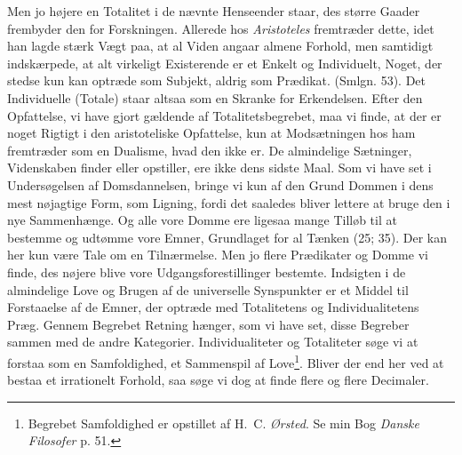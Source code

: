 \documentclass[12pt,a4paper]{book}
\newcommand{\apage}[1]{\marginnote{\footnotesize\textit{[#1]}}}
\begin{document}
Men jo højere en Totalitet i de nævnte Henseender staar, des større Gaader frembyder
den for Forskningen. Allerede hos \emph{Aristoteles} fremtræder dette, idet han
lagde stærk Vægt paa, at al Viden angaar almene Forhold, men samtidigt indskærpede,
at alt virkeligt Existerende er et Enkelt og Individuelt, Noget, der stedse kun kan
optræde som Subjekt, \apage{224} aldrig som Prædikat. (Smlgn. 53). Det Individuelle (Totale)
staar altsaa som en Skranke for Erkendelsen. Efter den Opfattelse, vi have gjort
gældende af Totalitetsbegrebet, maa vi finde, at der er noget Rigtigt i den
aristoteliske Opfattelse, kun at Modsætningen hos ham fremtræder som en Dualisme,
hvad den ikke er. De almindelige Sætninger, Videnskaben finder eller opstiller, ere
ikke dens sidste Maal. Som vi have set i Undersøgelsen af Domsdannelsen, bringe vi
kun af den Grund Dommen i dens mest nøjagtige Form, som Ligning, fordi det saaledes
bliver lettere at bruge den i nye Sammenhænge. Og alle vore Domme ere ligesaa mange
Tilløb til at bestemme og udtømme vore Emner, Grundlaget for al Tænken (25; 35).
Der kan her kun være Tale om en Tilnærmelse. Men jo flere Prædikater og Domme vi
finde, des nøjere blive vore Udgangsforestillinger bestemte. Indsigten i de
almindelige Love og Brugen af de universelle Synspunkter er et Middel til
Forstaaelse af de Emner, der optræde med Totalitetens og Individualitetens Præg.
Gennem Begrebet Retning hænger, som vi have set, disse Begreber sammen med de andre
Kategorier. Individualiteter og Totaliteter søge vi at forstaa som en Samfoldighed,
et Sammenspil af Love\footnote{Begrebet Samfoldighed er opstillet af H.\ C.
\emph{Ørsted}. Se min Bog \emph{Danske Filosofer} p. 51.}. Bliver der end her ved at
bestaa et irrationelt Forhold, saa søge vi dog at finde flere og flere Decimaler.
\end{document}
